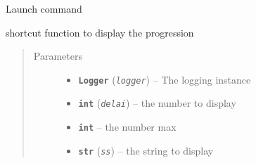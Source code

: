 \documentclass[a4paper,10pt,english]{sphinxmanual}
\begin{document}

\begin{fulllineitems}
\label{commands/apidoc/src:src.fork.launch_command}
Launch command

\end{fulllineitems}


\begin{fulllineitems}
\label{commands/apidoc/src:src.fork.show_progress}
shortcut function to display the progression
\begin{quote}\begin{description}
\item[{Parameters}] \leavevmode\begin{itemize}
\item {} 
\textbf{\texttt{Logger}} (\emph{\texttt{logger}}) -- The logging instance

\item {} 
\textbf{\texttt{int}} (\emph{\texttt{delai}}) -- the number to display

\item {} 
\textbf{\texttt{int}} -- the number max

\item {} 
\textbf{\texttt{str}} (\emph{\texttt{ss}}) -- the string to display

\end{itemize}

\end{description}\end{quote}

\end{fulllineitems}

\end{document}
